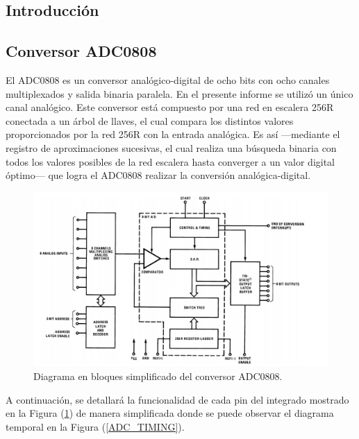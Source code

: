 



\subsection{Introducción}

\subsection{Conversor ADC0808}

El ADC0808 es un conversor analógico-digital de ocho bits con ocho canales multiplexados y salida binaria paralela. En el presente informe se utilizó un único canal analógico. Este conversor está compuesto por una red en escalera 256R conectada a un árbol de llaves, el cual compara los distintos valores proporcionados por la red 256R con la entrada analógica. Es así —mediante el registro de aproximaciones sucesivas, el cual realiza una búsqueda binaria con todos los valores posibles de la red escalera hasta converger a un valor digital óptimo— que logra el ADC0808 realizar la conversión analógica-digital.

\begin{figure}[H]
\centering
\includegraphics[width=0.75\linewidth]{ImagenesEjercicio1/ADC_BLOCK.png}
\caption{Diagrama en bloques simplificado del conversor ADC0808.}
\label{ADC_BLOCK}
\end{figure}

A continuación, se detallará la funcionalidad de cada pin del integrado mostrado en la Figura (\ref{ADC_BLOCK}) de manera simplificada donde se puede observar el diagrama temporal en la Figura (\ref{ADC_TIMING}).

